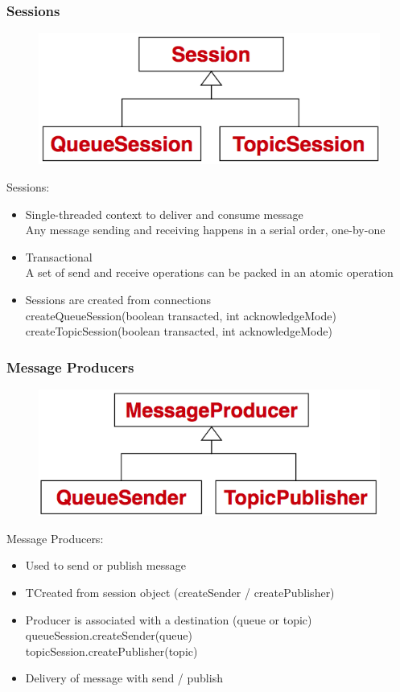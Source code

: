 \documentclass[10pt]{article}
\begin{document}
\subsubsection{Sessions}
\begin{figure}
	\centering
	\includegraphics[scale=0.2]{jms-api-session.png}%
\end{figure}
Sessions:
\begin{itemize}
	\item Single-threaded context to deliver and consume message \\
		Any message sending and receiving happens in a serial order, one-by-one
	\item Transactional \\
		A set of send and receive operations can be packed in an atomic operation
	\item Sessions are created from connections \\
		createQueueSession(boolean transacted, int acknowledgeMode)	 \\
		createTopicSession(boolean transacted, int acknowledgeMode)
\end{itemize}

\subsubsection{Message Producers}
\begin{figure}
	\centering
	\includegraphics[scale=0.2]{jms-api-message-producer.png}%
\end{figure}
Message Producers:
\begin{itemize}
	\item Used to send or publish message
	\item TCreated from session object (createSender / createPublisher)
	\item Producer is associated with a destination (queue or topic) \\
		queueSession.createSender(queue)	 \\
		topicSession.createPublisher(topic) 
	\item Delivery of message with send / publish
\end{itemize}
\end{document}
